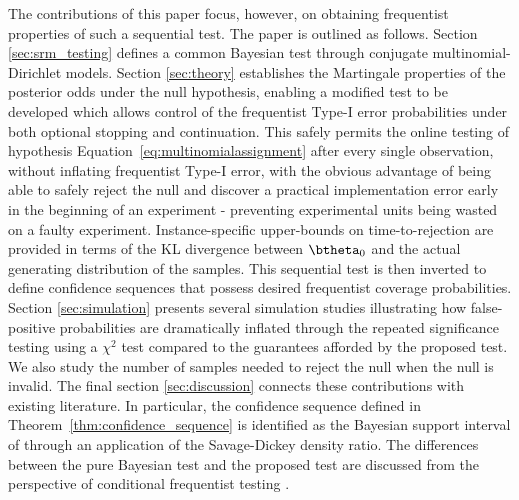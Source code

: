 \documentclass[11pt]{article}
\begin{document}
The contributions of this paper focus, however, on obtaining frequentist properties of such a sequential test.
The paper is outlined as follows.
Section \ref{sec:srm_testing} defines a common Bayesian test through conjugate multinomial-Dirichlet models.
Section \ref{sec:theory} establishes the Martingale properties of the posterior odds under the null hypothesis, enabling a modified test to be developed which allows control of the frequentist Type-I error probabilities under both optional stopping and continuation.
This safely permits the online testing of hypothesis Equation~\ref{eq:multinomialassignment} after every single observation, without inflating frequentist Type-I error, with the obvious advantage of being able to safely reject the null and discover a practical implementation error early in the beginning of an experiment - preventing experimental units being wasted on a faulty experiment.
Instance-specific upper-bounds on time-to-rejection are provided in terms of the KL divergence  between $\btheta_0$ and the actual generating distribution of the samples.
This sequential test is then inverted to define confidence sequences that possess desired frequentist coverage probabilities.
Section \ref{sec:simulation} presents several simulation studies illustrating how false-positive probabilities are dramatically inflated through the repeated significance testing using a $\chi^2$ test compared to the guarantees afforded by the proposed test.
We also study the number of samples needed to reject the null when the null is invalid.
The final section \ref{sec:discussion} connects these contributions with existing literature.
In particular, the confidence sequence defined in Theorem~\ref{thm:confidence_sequence} is identified as the Bayesian support interval of \cite{support_interval} through an application of the Savage-Dickey density ratio.
The differences between the pure Bayesian test and the proposed test are discussed from the perspective of conditional frequentist testing \citep{conditional_frequentist_simple, conditional_frequentist_precise, conditional_frequentist_composite}.
\end{document}
